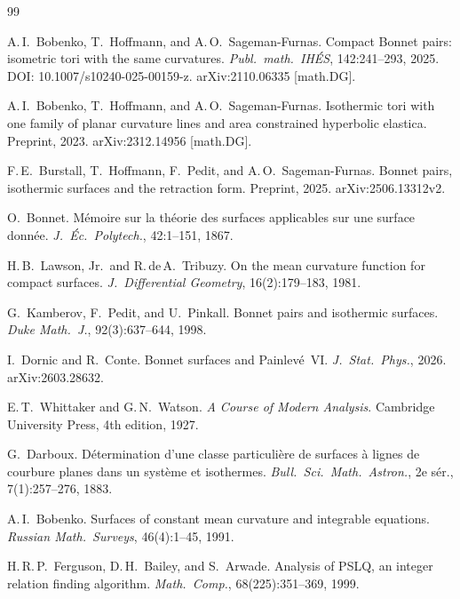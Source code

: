 \documentclass[11pt,a4paper]{article}
\theoremstyle{plain}
\theoremstyle{definition}
\theoremstyle{remark}
\begin{document}
\begin{thebibliography}{99}

A.\,I.~Bobenko, T.~Hoffmann, and A.\,O.~Sageman-Furnas.
\newblock Compact Bonnet pairs: isometric tori with the same curvatures.
\newblock \emph{Publ.\ math.\ IH\'ES}, 142:241--293, 2025.
\newblock DOI: 10.1007/s10240-025-00159-z.
\newblock arXiv:2110.06335 [math.DG].

A.\,I.~Bobenko, T.~Hoffmann, and A.\,O.~Sageman-Furnas.
\newblock Isothermic tori with one family of planar curvature lines and area
  constrained hyperbolic elastica.
\newblock Preprint, 2023.
\newblock arXiv:2312.14956 [math.DG].

F.\,E.~Burstall, T.~Hoffmann, F.~Pedit, and A.\,O.~Sageman-Furnas.
\newblock Bonnet pairs, isothermic surfaces and the retraction form.
\newblock Preprint, 2025.
\newblock arXiv:2506.13312v2.

O.~Bonnet.
\newblock M\'emoire sur la th\'eorie des surfaces applicables sur une
  surface donn\'ee.
\newblock \emph{J.\ \'Ec.\ Polytech.}, 42:1--151, 1867.

H.\,B.~Lawson, Jr.\ and R.\,de\,A.~Tribuzy.
\newblock On the mean curvature function for compact surfaces.
\newblock \emph{J.\ Differential Geometry}, 16(2):179--183, 1981.

G.~Kamberov, F.~Pedit, and U.~Pinkall.
\newblock Bonnet pairs and isothermic surfaces.
\newblock \emph{Duke Math.\ J.}, 92(3):637--644, 1998.

I.~Dornic and R.~Conte.
\newblock Bonnet surfaces and Painlev\'e~VI.
\newblock \emph{J.\ Stat.\ Phys.}, 2026.
\newblock arXiv:2603.28632.

E.\,T.~Whittaker and G.\,N.~Watson.
\newblock \emph{A Course of Modern Analysis}.
\newblock Cambridge University Press, 4th edition, 1927.

G.~Darboux.
\newblock D\'etermination d'une classe particuli\`ere de surfaces \`a
  lignes de courbure planes dans un syst\`eme et isothermes.
\newblock \emph{Bull.\ Sci.\ Math.\ Astron.}, 2e s\'er., 7(1):257--276,
  1883.

A.\,I.~Bobenko.
\newblock Surfaces of constant mean curvature and integrable equations.
\newblock \emph{Russian Math.\ Surveys}, 46(4):1--45, 1991.

H.\,R.\,P.~Ferguson, D.\,H.~Bailey, and S.~Arwade.
\newblock Analysis of PSLQ, an integer relation finding algorithm.
\newblock \emph{Math.\ Comp.}, 68(225):351--369, 1999.


\end{thebibliography}
\end{document}
